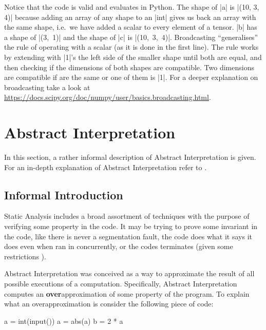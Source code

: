 Notice that the code is valid and evaluates in Python. The shape of
\pycode|a| is \pycode|(10, 3, 4)| because adding an array of any shape
to an \pycode|int| gives us back an array with the same shape, i.e.~we
have added a scalar to every element of a tensor. \pycode|b| has a shape
of \pycode|(3,\ 1)| and the shape of \pycode|c| is
\pycode|(10,\ 3,\ 4)|. Broadcasting \enquote{generalises} the rule of
operating with a scalar (as it is done in the first line). The rule
works by extending with \pycode|1|'s the left side of the smaller shape
until both are equal, and then checking if the dimensions of both shapes
are compatible. Two dimensions are compatible if are the same or one of
them is \pycode|1|. For a deeper explanation on broadcasting take a look
at \url{https://docs.scipy.org/doc/numpy/user/basics.broadcasting.html}.

\section{Abstract Interpretation}\label{abstract-interpretation}

In this section, a rather informal description of Abstract
Interpretation is given. For an in-depth explanation of Abstract
Interpretation refer to \autocites[Chapters 1 and
4]{nielson2015principles}{cousot_abstract_1977}{nipkow_abstract_2014}.

\subsection{Informal Introduction}\label{informal-introduction}

Static Analysis includes a broad assortment of techniques with the
purpose of verifying some property in the code. It may be trying to
prove some invariant in the code, like there is never a segmentation
fault, the code does what it says it does even when ran in concurrently,
or the codes terminates (given some restrictions
\autocite{urban_static_2015}).

Abstract Interpretation was conceived \autocite{cousot_abstract_1977} as
a way to approximate the result of all possible executions of a
computation. Specifically, Abstract Interpretation computes an
\textbf{over}approximation of some property of the program. To explain
what an overapproximation is consider the following piece of code:

\begin{pythoncode}
a = int(input())
a = abs(a)
b = 2 * a
\end{pythoncode}

